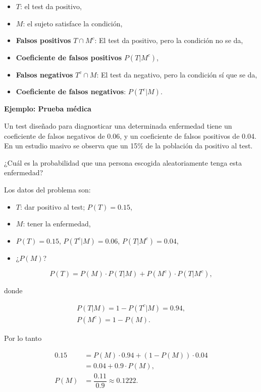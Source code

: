 \documentclass[]{book}
\providecommand{\tightlist}{%
  \setlength{\itemsep}{0pt}\setlength{\parskip}{0pt}}
\begin{document}
\begin{itemize}
\tightlist
\item
  \(T\): el test da positivo,
\item
  \(M\): el sujeto satisface la condición,
\item
  \textbf{Falsos positivos} \(T\cap M^c\): El test da positivo, pero la condición no se da,
\item
  \textbf{Coeficiente de falsos positivos} \(P(T|M^c)\),
\item
  \textbf{Falsos negativos} \(T^c\cap M\): El test da negativo, pero la condición sí que se da,
\item
  \textbf{Coeficiente de falsos negativos}: \(P(T^c|M)\).
\end{itemize}

\textbf{Ejemplo: Prueba médica}

Un test diseñado para diagnosticar una determinada enfermedad tiene un coeficiente de falsos negativos de 0.06, y un coeficiente de falsos positivos de 0.04. En un estudio masivo se observa que un 15\% de la población da positivo al test.

¿Cuál es la probabilidad que una persona escogida aleatoriamente tenga esta enfermedad?

Los datos del problema son:

\begin{itemize}
\tightlist
\item
  \(T\): dar positivo al test; \(P(T)=0.15\),
\item
  \(M\): tener la enfermedad,
\item
  \(P(T)=0.15\), \(P(T^c|M)=0.06\), \(P(T|M^c)=0.04\),
\item
  ¿\(P(M)\)?
\end{itemize}

\[
P(T) =P(M)\cdot P(T|M)+P(M^c)\cdot P(T|M^c),
\]

donde

\[
\begin{array}{l}
P(T|M)=1-P(T^c|M)=0.94, \\[1ex]
P(M^c)=1-P(M).
\end{array}
\]

Por lo tanto

\[
\begin{array}{rl}
0.15 & = P(M)\cdot 0.94+(1-P(M))\cdot 0.04\\
 & =0.04+0.9\cdot P(M),\\[1ex]
P(M) & =\dfrac{0.11}{0.9}\approx 0.1222.
\end{array}
\]
\end{document}
